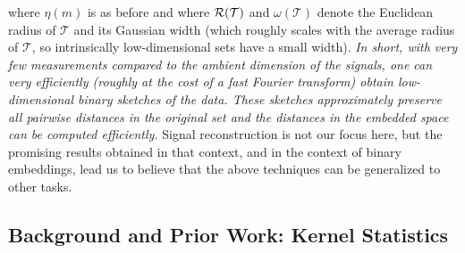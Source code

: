 where $\eta(m)$ is as before and \fi
where $\mathcal{R}(\mathcal{T})$ and $\omega(\mathcal{T})$ denote  the Euclidean radius of  $\mathcal{T}$ and its Gaussian width (which roughly scales with the average radius of $\mathcal{T}$, so  intrinsically low-dimensional sets have a small  width). %
 \emph{In short, with \emph{very few measurements} compared to the ambient dimension of the signals, one can very efficiently (roughly at the cost of a fast Fourier transform) obtain low-dimensional binary sketches of the data. These sketches approximately preserve all pairwise distances in the original set and the distances in the embedded space can be computed efficiently.}
Signal reconstruction is not our focus here, but the promising results obtained in that context, and in the context of binary embeddings, lead us to believe that the above techniques can be generalized to other tasks. 





\subsection{Background and Prior Work: Kernel Statistics}\label{sec:KernelBackground}

